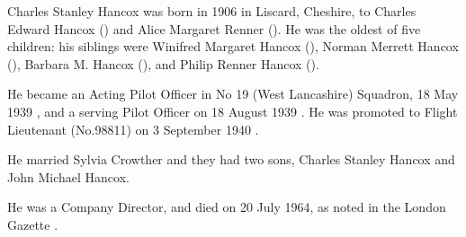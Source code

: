 
Charles Stanley Hancox was born in 1906 in Liscard, Cheshire, to Charles Edward Hancox () and Alice Margaret Renner ()\cite{CSHancoxBirth}. He was the oldest of five children: his siblings were Winifred Margaret Hancox (), Norman Merrett Hancox (), Barbara M. Hancox (), and Philip Renner Hancox ().

He became an Acting Pilot Officer in No 19 (West Lancashire) Squadron, 18 May 1939 \cite{CSHancox1}, and a serving Pilot Officer on 18 August 1939 \cite{CSHancox2}.  He was promoted to Flight Lieutenant (No.98811)  on 3 September 1940 \cite{CSHancox3}.

He married Sylvia Crowther and they had two sons, Charles Stanley Hancox and John Michael Hancox.
	
 He was a Company Director, and died on 20 July 1964, as noted in the London Gazette \cite{CSHancoxDeath}.
